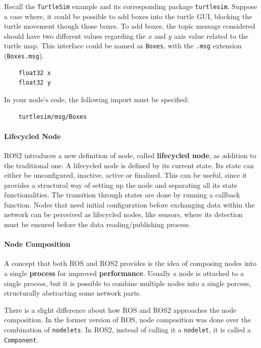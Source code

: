 Recall the \texttt{TurtleSim} example and its corresponding package \texttt{turtlesim}. Suppose a case where, it could be possible to add boxes into the turtle GUI, blocking the turtle movement though those boxes. To add boxes, the topic message considered should have two different values regarding the $x$ and $y$ axis value related to the turtle map. This interface could be named as \texttt{Boxes}, with the \texttt{.msg} extension (\texttt{Boxes.msg}).
               
\begin{verbatim}
    float32 x
    float32 y
\end{verbatim}

In your node's code, the following import must be specified:

\begin{verbatim}
    turtlesim/msg/Boxes
\end{verbatim}
               
\paragraph{Lifecycled Node}
               
ROS2 introduces a new definition of node, called \textbf{lifecycled node}, as addition to the traditional one. A lifecycled node is defined by its current state. Its state can either be unconfigured, inactive, active or finalized. This can be useful, since it provides a structural way of setting up the node and separating all its state functionalities. The transition through states are done by running a callback function. Nodes that need initial configuration before exchanging data within the network can be perceived as lifecycled nodes, like sensors, where its detection must be ensured before the data reading/publishing process. 
               
\paragraph{Node Composition}
               
A concept that both ROS and ROS2 provides is the idea of composing nodes into a single \textbf{process} for improved \textbf{performance}. Usually a node is attached to a single process, but it is possible to combine multiple nodes into a single porcess, structurally abstracting some network parts. 

There is a slight difference about how ROS and ROS2 approaches the node composition. In the former version of ROS, node composition was done over the combination of \texttt{nodelets}. In ROS2, instead of calling it a \texttt{nodelet}, it is called a \texttt{Component}. 

